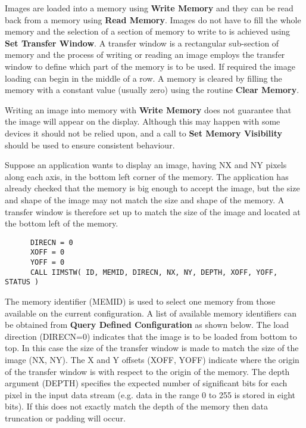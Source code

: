 Images are loaded into a memory using {\bf Write Memory} and they can be
read back from a memory using {\bf Read Memory}. Images do not have to
fill the whole memory and the selection of a section of memory to write
to is achieved using {\bf Set Transfer Window}. A transfer window is a
rectangular sub-section of memory and the process of writing or reading
an image employs the transfer window to define which part of the
memory is to be used. If required the image
loading can begin in the middle of a row. A memory is cleared by
filling the memory with a constant value (usually zero) using the
routine {\bf Clear Memory}.

Writing an image into memory with {\bf Write Memory} does not
guarantee that the image will appear on the display. Although this
may happen with some devices it should not be relied upon, and a
call to {\bf Set Memory Visibility} should be used to ensure
consistent behaviour.

Suppose an application wants to display an image, having NX and NY
pixels along each axis, in the bottom left corner of the memory.
The application has already checked that the memory is big
enough to accept the image, but the size and shape of the image may
not match the size and shape of the memory. A transfer window is
therefore set up to match the size of the image and located at the
bottom left of the memory.
\begin{small}
\begin{verbatim}
      DIRECN = 0
      XOFF = 0
      YOFF = 0
      CALL IIMSTW( ID, MEMID, DIRECN, NX, NY, DEPTH, XOFF, YOFF, STATUS )
\end{verbatim}
\end{small}
The memory identifier (MEMID) is used to select one memory from those
available on the current configuration. A list of available memory
identifiers can be obtained from {\bf Query Defined Configuration}
as shown below. The load direction (DIRECN=0) indicates that the image
is to be loaded from bottom to top. In this case the size of the transfer
window is made to match the size of the image (NX, NY). The X and Y
offsets (XOFF, YOFF) indicate where the origin of the transfer window
is with respect to the origin of the memory. The depth
argument (DEPTH) specifies the expected number of significant bits
for each pixel in the input data stream (e.g. data in the range 0 to
255 is stored in eight bits). If this does not exactly match the
depth of the memory then data truncation or padding will occur.

